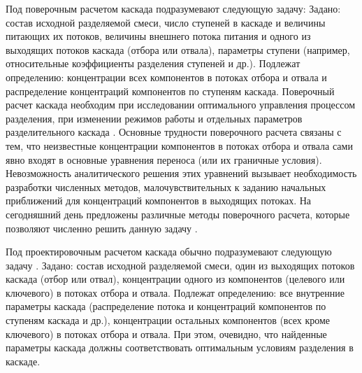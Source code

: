 Под поверочным расчетом каскада подразумевают следующую задачу:
Задано: состав исходной разделяемой смеси,  число ступеней в каскаде и величины питающих их потоков, величины внешнего потока питания и одного из выходящих потоков каскада (отбора или отвала), параметры ступени (например, относительные коэффициенты разделения ступеней и др.).
Подлежат определению: концентрации всех компонентов в потоках отбора  и отвала и распределение концентраций компонентов по ступеням каскада. 
Поверочный расчет каскада необходим при исследовании оптимального управления процессом разделения, при изменении режимов работы и отдельных параметров разделительного каскада \cite{sulaberidzeTeoriyaKaskadovDlya2011}. Основные трудности поверочного расчета связаны с тем, что неизвестные концентрации компонентов в потоках отбора и отвала сами явно входят в основные уравнения переноса (или их граничные условия). Невозможность аналитического решения этих уравнений вызывает необходимость разработки численных методов, малочувствительных к заданию начальных приближений для концентраций компонентов в выходящих потоках. На сегодняшний день предложены различные методы поверочного расчета, которые позволяют численно решить данную задачу \cite{sulaberidzeTeoriyaKaskadovDlya2011, sazykinUsovershenstvovannyyMetodRascheta1997, wuCalculationMethodsDetermining1988, holpanovEffektivnyyMetodRascheta1998, potapovCalculationSquaredoffCascades1996, zengRobustEfficientCalculation2000}.

Под проектировочным расчетом каскада обычно подразумевают следующую задачу \cite{sulaberidzeTeoriyaKaskadovDlya2011}.
Задано: состав исходной разделяемой смеси, один из выходящих потоков каскада (отбор или отвал), концентрации одного из компонентов (целевого или ключевого) в потоках отбора и отвала.
Подлежат определению: все внутренние параметры каскада (распределение потока и концентраций компонентов по ступеням каскада и др.), концентрации остальных компонентов (всех кроме ключевого) в потоках отбора и отвала. 
При этом, очевидно, что найденные параметры каскада должны соответствовать оптимальным условиям разделения в каскаде.

